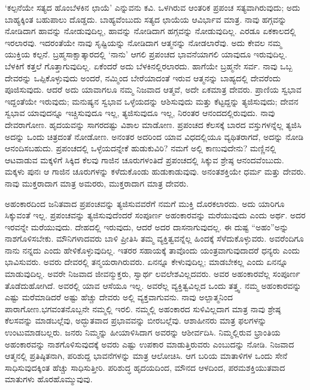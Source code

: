 `ಕಲ್ಪನೆಯೇ ಸತ್ಯದ ಹೊಂಬೆಳಕಿನ ಛಾಯೆ' ಎನ್ನುವನು ಕವಿ. ಒಳಗಿರುವ ಆಂತರಿಕ ಪ್ರಪಂಚ ಸತ್ಯವಾಗಿರುವುದು; ಅದು ಬಾಹ್ಯಕ್ಕಿಂತ ಬಹುಪಾಲು ದೊಡ್ಡದು. ಬಾಹ್ಯವೆಂಬುದು ಸತ್ಯದ ಛಾಯೆಯ ಆವಿರ್ಭಾವ ಮಾತ್ರ. ನಾವು ಹಗ್ಗವನ್ನು ನೋಡಿದಾಗ ಹಾವನ್ನು ನೋಡುವುದಿಲ್ಲ, ಹಾವನ್ನು ನೋಡಿದಾಗ ಹಗ್ಗವನ್ನು ನೋಡುವುದಿಲ್ಲ. ಎರಡೂ ಏಕಕಾಲದಲ್ಲಿ ಇರಲಾರವು. ಇದರಂತೆಯೇ ನಾವು ಸೃಷ್ಟಿಯನ್ನು ನೋಡಿದಾಗ ಆತ್ಮನನ್ನು ನೋಡಲಾರೆವು. ಅದು ಕೇವಲ ನಮ್ಮ ಯುಕ್ತಿಯ ಕಲ್ಪನೆ. ಬ್ರಹ್ಮಸಾಕ್ಷಾತ್ಕಾರದಲ್ಲಿ `ನಾನು' ಆಗಲಿ ಪ್ರಪಂಚದ ಭಾವನೆಯಾಗಲಿ ಯಾವುದೂ ಇರುವುದಿಲ್ಲ. ಬೆಳಕಿಗೆ ಕತ್ತಲೆ ಗೊತ್ತಾಗುವುದಿಲ್ಲ. ಏಕೆಂದರೆ ಅದು ಬೆಳಕಿನಲ್ಲಿರಲಾರದು. ಹಾಗೆಯೇ ಬ್ರಹ್ಮನೇ ಸರ್ವ. ನಾವು ಒಬ್ಬ ದೇವರನ್ನು ಒಪ್ಪಿಕೊಳ್ಳುವುದು ಅಂದರೆ, ನಮ್ಮಿಂದ ಬೇರೆಯಾದಂತೆ ಇರುವ ಆತ್ಮನನ್ನು ಬಾಹ್ಯದಲ್ಲಿ ದೇವರೆಂದು ಪೂಜಿಸುವುದು. ಆದರೆ ಅದು ಯಾವಾಗಲೂ ನಮ್ಮ ನಿಜವಾದ ಆತ್ಮವೆ, ಅದೇ ಏಕಮಾತ್ರ ದೇವರು. ಪ್ರಾಣಿಯ ಸ್ವಭಾವ ಇದ್ದಂತೆಯೇ ಇರುವುದು; ಮನುಷ್ಯನ ಸ್ವಭಾವ ಒಳ್ಳೆಯದನ್ನು ಆಶಿಸುವುದು ಮತ್ತು ಕೆಟ್ಟದ್ದನ್ನು ತ್ಯಜಿಸುವುದು; ದೇವನ ಸ್ವಭಾವ ಯಾವುದನ್ನೂ ಇಚ್ಚಿಸುವುದೂ ಇಲ್ಲ, ತ್ಯಜಿಸುವುದೂ ಇಲ್ಲ, ನಿರಂತರ ಆನಂದದಲ್ಲಿರುವುದು. ನಾವು ದೇವರಾಗೋಣ. ಹೃದಯವನ್ನು ಸಾಗರದಷ್ಟು ವಿಶಾಲ ಮಾಡೋಣ. ಪ್ರಪಂಚದ ಕೆಲಸಕ್ಕೆ ಬಾರದ ವಸ್ತುಗಳನ್ನೆಲ್ಲ ತ್ಯಜಿಸಿ ಅದನ್ನು ಒಂದು ಚಿತ್ರದಂತೆ ನೋಡೋಣ. ಅನಂತರ ಅದರಿಂದ ಯಾವ ವಿಧದಲ್ಲಿಯೂ ವ್ಯಥಿತರಾಗದೆ, ಅದನ್ನು ನೋಡಿ ಆನಂದಿಸಬಹುದು. ಪ್ರಪಂಚದಲ್ಲಿ ಒಳ್ಳೆಯದನ್ನೇಕೆ ಹುಡುಕುವಿರಿ? ನಮಗೆ ಅಲ್ಲಿ ಕಾಣುವುದೇನು? ಮಣ್ಣಿನಲ್ಲಿ ಆಟವಾಡುವ ಮಕ್ಕಳಿಗೆ ಸಿಕ್ಕಿದ ಕೆಲವು ಗಾಜಿನ ಚೂರುಗಳಂತಿದೆ ಪ್ರಪಂಚದಲ್ಲಿ ಸಿಕ್ಕುವ ಶ್ರೇಷ್ಠ ಆನಂದವೆಂಬುದು. ಮಕ್ಕಳು ಪುನಃ ಆ ಗಾಜಿನ ಚೂರುಗಳನ್ನು ಕಳೆದುಕೊಂಡು ಹುಡುಕಾಡುವುವು. ಅನಂತಶಕ್ತಿಯೇ ಧರ್ಮ ಮತ್ತು ದೇವರು. ನಾವು ಮುಕ್ತರಾದಾಗ ಮಾತ್ರ ಅಮರರು, ಮುಕ್ತರಾದಾಗ ಮಾತ್ರ ದೇವರು.

ಅಹಂಕಾರದಿಂದ ಜನಿತವಾದ ಪ್ರಪಂಚವನ್ನು ತ್ಯಜಿಸುವವರೆಗೆ ನಮಗೆ ಮುಕ್ತಿ ದೊರಕಲಾರದು. ಅದು ಯಾರಿಗೂ ಸಿಕ್ಕುವಂತೆ ಇಲ್ಲ. ಪ್ರಪಂಚವನ್ನು ತ್ಯಜಿಸುವುದೆಂದರೆ ಸಂಪೂರ್ಣ ಅಹಂಕಾರವನ್ನು ಮರೆಯುವುದು ಎಂದು ಅರ್ಥ. ಅದರ ಇರವನ್ನೇ ಮರೆಯುವುದು. ದೇಹದಲ್ಲಿ ಇರುವುದು, ಆದರೆ ಅದರ ದಾಸನಾಗುವುದಲ್ಲ. ಈ ದುಷ್ಟ “ಅಹಂ''ಅನ್ನು ನಾಶಗೊಳಿಸಬೇಕು. ಮೌನಿಗಳಾದವರು ಬಾಳಿ ಪ್ರೀತಿಸಿ ತಮ್ಮ ವ್ಯಕ್ತಿತ್ವವನ್ನೆಲ್ಲ ಹಿಂದಕ್ಕೆ ಸೆಳೆದುಕೊಳ್ಳುವರು. ಅವರೆಂದಿಗೂ ನಾನು ನನ್ನದು ಎಂದು ಹೇಳಿಕೊಳ್ಳುವುದಿಲ್ಲ. ಇತರರ ಸಹಾಯಕ್ಕೆ ತಾವೊಂದು ಯಂತ್ರವಾಗುವುದಾದರೆ ಧನ್ಯರು ಎಂದು ಭಾವಿಸುವರು. ಅವರು ದೇವರಲ್ಲಿ ತನ್ಮಯರಾಗಿರುವರು. ಏನನ್ನೂ ಕೇಳುವುದಿಲ್ಲ; ಮಾಡಬೇಕಲ್ಲ ಎಂದು ಏನನ್ನೂ ಮಾಡುವುದಿಲ್ಲ. ಅವರೇ ನಿಜವಾದ ಜೀವನ್ಮುಕ್ತರು, ಸ್ವಾರ್ಥ ಲವಲೇಶವಿಲ್ಲದವರು. ಅವರ ಅಹಂಕಾರವೆಲ್ಲ ಸಂಪೂರ್ಣ ತೊಡೆದುಹೋಗಿದೆ. ಅವರಲ್ಲಿ ಯಾವ ಆಸೆಯೂ ಇಲ್ಲ. ಅವರೆಲ್ಲ ವ್ಯಕ್ತಿತ್ವವಿಲ್ಲದ ಒಂದು ತತ್ತ್ವ. ನಮ್ಮ ಅಹಂಕಾರವನ್ನು ಎಷ್ಟು ಮರೆಮಾಡಿದರೆ ಅಷ್ಟು ಹೆಚ್ಚು ದೇವರು ಅಲ್ಲಿ ವ್ಯಕ್ತವಾಗುವನು. ನಾವು ಅಲ್ಪಾತ್ಮನಿಂದ ಪಾರಾಗೋಣ.\break ಭಗವಂತನೊಬ್ಬನೇ ನಮ್ಮಲ್ಲಿ ಇರಲಿ. ನಮ್ಮಲ್ಲಿ ಅಹಂಕಾರದ ಸುಳಿವಿಲ್ಲದಾಗ ಮಾತ್ರ ನಾವು ಶ್ರೇಷ್ಠ ಕೆಲಸವನ್ನು ಮಾಡಬಲ್ಲೆವು, ಅದ್ಭುತವಾದ ಪ್ರಭಾವವನ್ನು ಬೀರಬಲ್ಲೆವು. ಆಶಾಹೀನರು ಮಾತ್ರ ಫಲಗಳನ್ನು ಉಂಟುಮಾಡಬಲ್ಲರು. ಜನರು ನಿಮ್ಮನ್ನು ಹೀಯಾಳಿಸಿದಾಗ ಅವರನ್ನು ಆಶೀರ್ವದಿಸಿ. ನಿಮ್ಮಲ್ಲಿರುವ ಭ್ರಾಂತಿಯ ಅಹಂಕಾರವನ್ನು ನಾಶಗೊಳಿಸುವುದಕ್ಕೆ ಅವರು ಎಷ್ಟು ಉಪಕಾರ ಮಾಡುತ್ತಿರುವರು ಎಂಬುದನ್ನು ನೋಡಿ. ನಿಜವಾದ ಆತ್ಮನಲ್ಲಿ ಪ್ರತಿಷ್ಠಿತನಾಗಿ, ಪರಿಶುದ್ದ ಭಾವನೆಗಳನ್ನು ಮಾತ್ರ ಆಲೋಚಿಸಿ. ಆಗ ಬರಿಯ ಮಾತಾಳಿಗಳ ಒಂದು ಸೇನೆ ಸಾಧಿಸುವುದಕ್ಕಿಂತ ಹೆಚ್ಚು ಸಾಧಿಸುತ್ತೀರಿ. ಪರಿಶುದ್ಧ ಹೃದಯದಿಂದ, ಮೌನದ ಆಳದಿಂದ, ಪರಮಶಕ್ತಿಯುತವಾದ ಮಾತುಗಳು ಹೊರಹೊಮ್ಮುವುವು.

